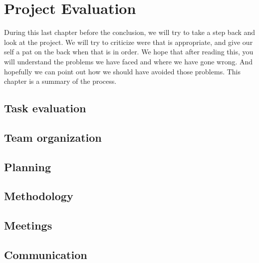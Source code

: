 \section{Project Evaluation}\label{Project Evaluation}
    During this last chapter before the conclusion, we will try to take a step back and look at the project. We will try to criticize were that is appropriate, and give our self a pat on the back when that is in order. We hope that after reading this, you will understand the problems we have faced and where we have gone wrong. And hopefully we can point out how we should have avoided those problems. This chapter is a summary of the process.
    
    \subsection{Task evaluation}
    \label{evaluation:task}
        
        
    \subsection{Team organization}
    \label{evaluation:team organization}
        
        
    \subsection{Planning}
    \label{evaluation:planning}
        
        
    \subsection{Methodology}
    \label{evaluation:methodology}
        
        
    \subsection{Meetings}
    \label{evaluation:meetings}
        
        
    \subsection{Communication}
    \label{evaluation:communication}
        
        
